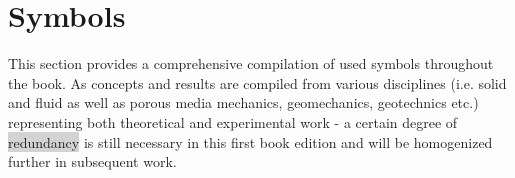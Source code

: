 \chapter{Symbols}

This section provides a comprehensive compilation of used symbols throughout the book. As concepts and results are compiled from various disciplines (i.e. solid and fluid as well as porous media mechanics, geomechanics, geotechnics etc.) representing both theoretical and experimental work - a certain degree of \colorbox{lightgray}{redundancy} is still necessary in this first book edition and will be homogenized further in subsequent work.


